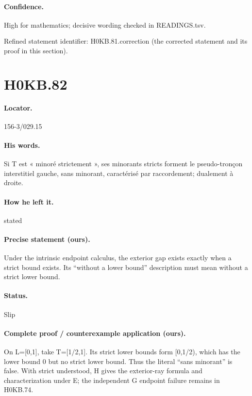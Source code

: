 \paragraph{Confidence.} High for mathematics; decisive wording checked in READINGS.tsv.

\noindent Refined statement identifier: H0KB.81.correction (the corrected statement and its proof in this section).

\section*{H0KB.82}\label{statement:H0KB.82}
\paragraph{Locator.} 156-3/029.15

\paragraph{His words.} Si T est « minoré strictement », ses minorants stricts forment le pseudo-tronçon interstitiel gauche, sans minorant, caractérisé par raccordement; dualement à droite.

\paragraph{How he left it.} stated

\paragraph{Precise statement (ours).} Under the intrinsic endpoint calculus, the exterior gap exists exactly when a strict bound exists. Its “without a lower bound” description must mean without a strict lower bound.

\paragraph{Status.} Slip

\paragraph{Complete proof / counterexample application (ours).} On L=[0,1], take T=[1/2,1]. Its strict lower bounds form [0,1/2), which has the lower bound 0 but no strict lower bound. Thus the literal “sans minorant” is false. With strict understood, H gives the exterior-ray formula and characterization under E; the independent G endpoint failure remains in H0KB.74.


